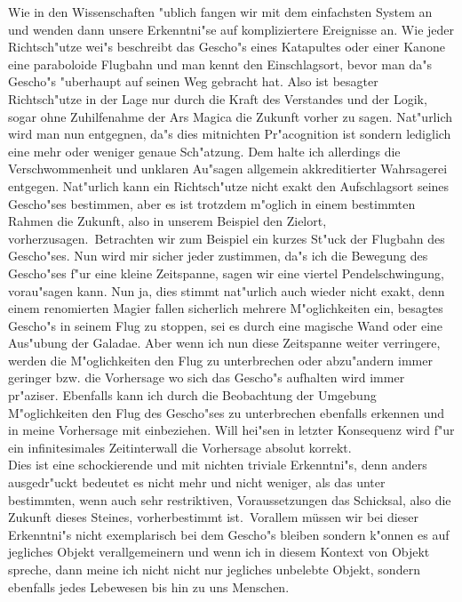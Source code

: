 \documentclass[a5paper,8pt]{book}
\begin{document}
Wie in den Wissenschaften "ublich fangen wir mit dem einfachsten System an und wenden dann unsere Erkenntni"se auf kompliziertere Ereignisse an. Wie jeder Richtsch"utze 
wei"s beschreibt das Gescho"s eines Katapultes oder einer Kanone eine paraboloide Flugbahn und man kennt den Einschlagsort, bevor man da"s Gescho"s "uberhaupt auf seinen Weg 
gebracht hat. Also ist besagter Richtsch"utze in der Lage nur durch die Kraft des Verstandes und der Logik, sogar ohne Zuhilfenahme der Ars Magica die Zukunft vorher zu sagen. 
Nat"urlich wird man nun entgegnen, da"s dies mitnichten Pr"acognition ist sondern lediglich eine mehr oder weniger genaue Sch"atzung. Dem halte ich allerdings die 
Verschwommenheit und unklaren Au"sagen allgemein akkreditierter Wahrsagerei entgegen.
Nat"urlich kann ein Richtsch"utze nicht exakt den Aufschlagsort seines Gescho"ses bestimmen, aber es ist trotzdem m"oglich in einem bestimmten Rahmen die Zukunft, also in unserem 
Beispiel den Zielort, vorherzusagen.\
Betrachten wir zum Beispiel ein kurzes St"uck der Flugbahn des Gescho"ses. Nun wird mir sicher jeder zustimmen, da"s ich die Bewegung des Gescho"ses f"ur eine kleine Zeitspanne, 
sagen wir eine viertel Pendelschwingung, vorau"sagen kann. Nun ja, dies stimmt nat"urlich auch wieder nicht exakt, denn einem renomierten Magier fallen sicherlich mehrere 
M"oglichkeiten ein, besagtes Gescho"s in seinem Flug zu stoppen, sei es durch eine magische Wand oder eine Aus"ubung der Galadae.
Aber wenn ich nun diese Zeitspanne weiter verringere, werden die M"oglichkeiten den Flug zu unterbrechen oder abzu"andern immer geringer bzw. die Vorhersage wo sich das Gescho"s 
aufhalten wird immer pr"aziser. Ebenfalls kann ich durch die Beobachtung der Umgebung M"oglichkeiten den Flug des Gescho"ses zu unterbrechen ebenfalls erkennen und in meine 
Vorhersage mit einbeziehen. Will hei"sen in letzter Konsequenz wird f"ur ein infinitesimales Zeitinterwall die Vorhersage absolut korrekt.\\

Dies ist eine schockierende und mit nichten triviale Erkenntni"s, denn anders ausgedr"uckt bedeutet es nicht mehr und nicht weniger, als das unter bestimmten, wenn auch sehr 
restriktiven, Voraussetzungen das Schicksal, also die Zukunft dieses Steines, vorherbestimmt ist.\
Vorallem müssen wir bei dieser Erkenntni"s nicht exemplarisch bei dem Gescho"s bleiben sondern k"onnen es auf jegliches Objekt verallgemeinern und wenn ich in diesem Kontext 
von Objekt spreche, dann meine ich nicht nicht nur jegliches unbelebte Objekt, sondern ebenfalls jedes Lebewesen bis hin zu uns Menschen.\\
\end{document}
